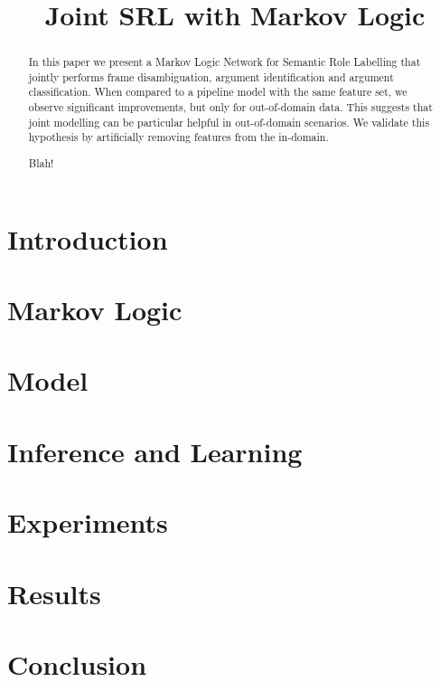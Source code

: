 \documentclass[11pt]{article}
\title{Joint SRL with Markov Logic}
\author{}
\date{}
\begin{document}



\maketitle
\begin{abstract}
In this paper we present a Markov Logic Network for Semantic Role
Labelling that jointly performs frame disambiguation, argument
identification and argument classification. When compared to a
pipeline model with the same feature set, we observe significant
improvements, but only for out-of-domain data. This suggests that
joint modelling can be particular helpful in out-of-domain
scenarios. We validate this hypothesis by artificially removing
features from the in-domain.  

Blah!
\end{abstract}

\section{Introduction}



\section{Markov Logic} \label{sec:markovlogic}



\section{Model} \label{sec:model} 



\section{Inference and Learning}\label{sec:inference}

%


\section{Experiments}



\section{Results}\label{sec:results}

%

\section{Conclusion} \label{sec:conclusion}

%



\end{document}
